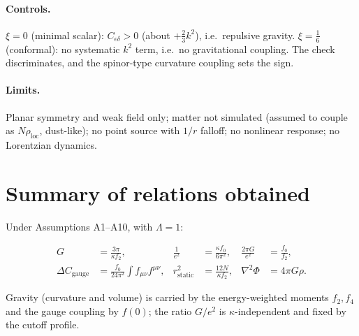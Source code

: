 \documentclass[11pt]{article}
\begin{document}
\paragraph{Controls.} $\xi=0$ (minimal scalar): $C_{\epsilon\delta}>0$ (about $+\tfrac23k^2$), i.e.\ repulsive gravity.
$\xi=\tfrac16$ (conformal): no systematic $k^2$ term, i.e.\ no gravitational coupling. The check discriminates, and the spinor-type
curvature coupling sets the sign.

\paragraph{Limits.} Planar symmetry and weak field only; matter not simulated (assumed to couple as $N\rho_{\mathrm{loc}}$,
dust-like); no point source with $1/r$ falloff; no nonlinear response; no Lorentzian dynamics.


\section{Summary of relations obtained}
\label{sec:summary}
Under Assumptions A1--A10, with $\Lambda=1$:

\begin{align}
G&=\frac{3\pi}{\kappa f_2}, & \frac1{e^2}&=\frac{\kappa f_0}{6\pi^2}, & \frac{2\pi G}{e^2}&=\frac{f_0}{f_2},\\
\Delta C_{\mathrm{gauge}}&=\frac{f_0}{24\pi^2}\!\int\! f_{\mu\nu}f^{\mu\nu}, &
r^2_{\mathrm{static}}&=\frac{12N}{\kappa f_2}, & \nabla^2\Phi&=4\pi G\rho.
\end{align}

Gravity (curvature and volume) is carried by the energy-weighted moments $f_2,f_4$ and the gauge coupling by $f(0)$; the
ratio $G/e^2$ is $\kappa$-independent and fixed by the cutoff profile.
\end{document}
